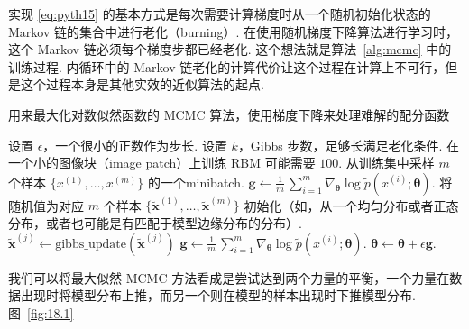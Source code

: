 实现 \eqref{eq:pyth15} 的基本方式是每次需要计算梯度时从一个随机初始化状态的 Markov 链的集合中进行老化（burning）. 在使用随机梯度下降算法进行学习时，这个 Markov 链必须每个梯度步都已经老化. 这个想法就是算法~\ref{alg:mcmc}
中的训练过程. 内循环中的 Markov 链老化的计算代价让这个过程在计算上不可行，但是这个过程本身是其他实效的近似算法的起点. 




\begin{algorithm}
\begin{algorithmic}
\caption{用来最大化对数似然函数的 MCMC 算法，使用梯度下降来处理难解的配分函数}
\label{alg:mcmc}
\STATE 设置 $\epsilon$，一个很小的正数作为步长.
\STATE 设置 $k$，Gibbs 步数，足够长满足老化条件. 在一个小的图像块（image patch）上训练 RBM 可能需要 $100$.
	\STATE 从训练集中采样 $m$ 个样本 $\{x^{(1)},\dots,x^{(m)}\}$ 的一个\gls{minibatch}.
	\STATE $\mathbf{g} \leftarrow \frac{1}{m}\,\sum_{i = 1}^{m} \nabla_{\pmb{\theta}} \log\tilde{p}(x^{(i)};\pmb{\theta})$.
	\STATE 将随机值为对应 $m$ 个样本 $\{\tilde{\mathbf{x}}^{(1)},\dots,\tilde{\mathbf{x}}^{(m)}\}$ 初始化（如，从一个均匀分布或者正态分布，或者也可能是有匹配于模型边缘分布的分布）.
		\STATE $\tilde{\mathbf{x}}^{(j)} \leftarrow \mathrm{gibbs\_update}(\tilde{\mathbf{x}}^{(j)})$
		\ENDFOR
	\ENDFOR
	\STATE $\mathbf{g} \leftarrow \frac{1}{m}\,\sum_{i = 1}^{m} \nabla_{\pmb{\theta}} \log\tilde{p}(x^{(i)};\pmb{\theta})$.
	\STATE $\pmb{\theta} \leftarrow \pmb{\theta} + \epsilon \mathbf{g}$.
\ENDWHILE

\end{algorithmic}
\end{algorithm}

我们可以将最大似然 MCMC 方法看成是尝试达到两个力量的平衡，一个力量在数据出现时将模型分布上推，而另一个则在模型的样本出现时下推模型分布. 
图~\ref{fig:18.1}


